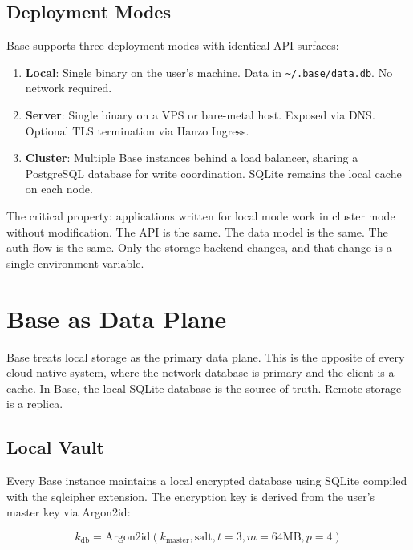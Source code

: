\documentclass[11pt]{article}
\begin{document}
\subsection{Deployment Modes}

Base supports three deployment modes with identical API surfaces:

\begin{enumerate}[leftmargin=1.4em]
    \item \textbf{Local}: Single binary on the user's machine. Data in
    \texttt{\textasciitilde/.base/data.db}. No network required.
    \item \textbf{Server}: Single binary on a VPS or bare-metal host. Exposed
    via DNS. Optional TLS termination via Hanzo Ingress.
    \item \textbf{Cluster}: Multiple Base instances behind a load balancer,
    sharing a PostgreSQL database for write coordination. SQLite remains the
    local cache on each node.
\end{enumerate}

The critical property: applications written for local mode work in cluster mode
without modification. The API is the same. The data model is the same. The
auth flow is the same. Only the storage backend changes, and that change is a
single environment variable.

\section{Base as Data Plane}
\label{sec:dataplane}

Base treats local storage as the primary data plane. This is the opposite of
every cloud-native system, where the network database is primary and the client
is a cache. In Base, the local SQLite database is the source of truth. Remote
storage is a replica.

\subsection{Local Vault}

Every Base instance maintains a local encrypted database using SQLite compiled
with the sqlcipher extension. The encryption key is derived from the user's
master key via Argon2id:

\begin{equation}
k_{\text{db}} = \text{Argon2id}(k_{\text{master}}, \text{salt}, t=3, m=64\text{MB}, p=4)
\end{equation}
\end{document}
